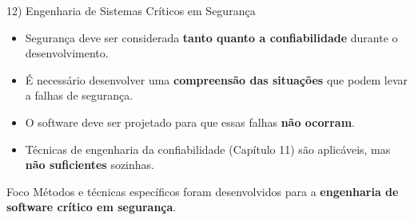 \documentclass[aspectratio=169]{beamer}
\begin{document}
\begin{frame}{12) Engenharia de Sistemas Críticos em Segurança}
  \begin{itemize}
    \item Segurança deve ser considerada \textbf{tanto quanto a confiabilidade} durante o desenvolvimento.
    \item É necessário desenvolver uma \textbf{compreensão das situações} que podem levar a falhas de segurança.
    \item O software deve ser projetado para que essas falhas \textbf{não ocorram}.
    \item Técnicas de engenharia da confiabilidade (Capítulo 11) são aplicáveis, mas \textbf{não suficientes} sozinhas.
  \end{itemize}
  \vspace{0.4em}
  \begin{exampleblock}{Foco}
    Métodos e técnicas específicos foram desenvolvidos para a \textbf{engenharia de software crítico em segurança}.
  \end{exampleblock}
\end{frame}
\end{document}
